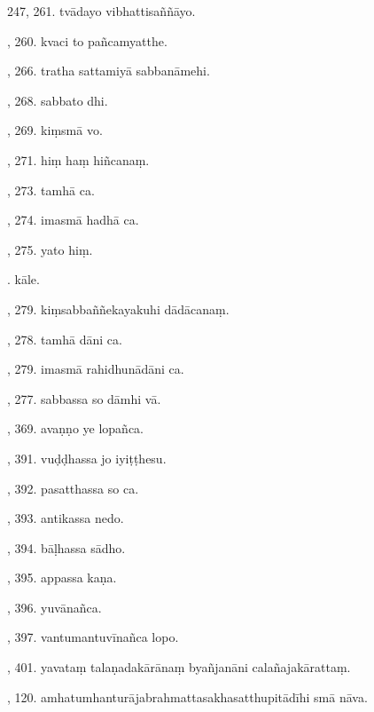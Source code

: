247, 261. tvādayo vibhattisaññāyo.\hfill \pageref{sut:247}\par {}, 260. kvaci to pañcamyatthe.\hfill \pageref{sut:248}\par {}, 266. tratha sattamiyā sabbanāmehi.\hfill \pageref{sut:249}\par {}, 268. sabbato dhi.\hfill \pageref{sut:250}\par {}, 269. kiṃsmā vo.\hfill \pageref{sut:251}\par {}, 271. hiṃ haṃ hiñcanaṃ.\hfill \pageref{sut:252}\par {}, 273. tamhā ca.\hfill \pageref{sut:253}\par {}, 274. imasmā hadhā ca.\hfill \pageref{sut:254}\par {}, 275. yato hiṃ.\hfill \pageref{sut:255}\par {}. kāle.\hfill \pageref{sut:256}\par {}, 279. kiṃsabbaññekayakuhi dādācanaṃ.\hfill \pageref{sut:257}\par {}, 278. tamhā dāni ca.\hfill \pageref{sut:258}\par {}, 279. imasmā rahidhunādāni ca.\hfill \pageref{sut:259}\par {}, 277. sabbassa so dāmhi vā.\hfill \pageref{sut:260}\par {}, 369. avaṇṇo ye lopañca.\hfill \pageref{sut:261}\par {}, 391. vuḍḍhassa jo iyiṭṭhesu.\hfill \pageref{sut:262}\par {}, 392. pasatthassa so ca.\hfill \pageref{sut:263}\par {}, 393. antikassa nedo.\hfill \pageref{sut:264}\par {}, 394. bāḷhassa sādho.\hfill \pageref{sut:265}\par {}, 395. appassa kaṇa.\hfill \pageref{sut:266}\par {}, 396. yuvānañca.\hfill \pageref{sut:267}\par {}, 397. vantumantuvīnañca lopo.\hfill \pageref{sut:268}\par {}, 401. yavataṃ talaṇadakārānaṃ byañjanāni calañajakārattaṃ.\hfill \pageref{sut:269}\par {}, 120. amhatumhanturājabrahmattasakhasatthupitādīhi smā nāva.\hfill \pageref{sut:270}\par \noindent
